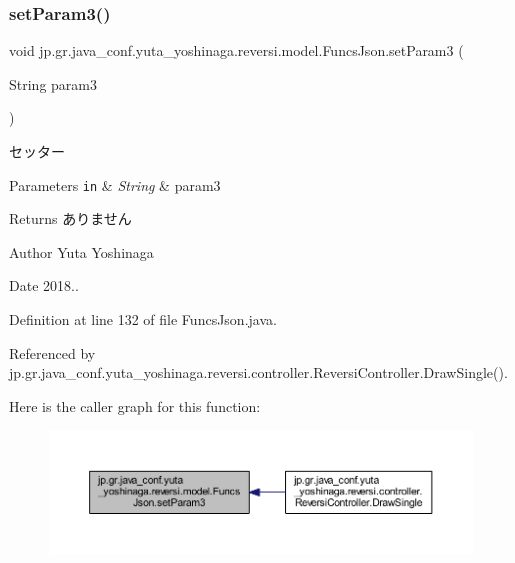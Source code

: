 \subsubsection{\texorpdfstring{set\+Param3()}{setParam3()}}
{\footnotesize\ttfamily void jp.\+gr.\+java\+\_\+conf.\+yuta\+\_\+yoshinaga.\+reversi.\+model.\+Funcs\+Json.\+set\+Param3 (\begin{DoxyParamCaption}\item[{String}]{param3 }\end{DoxyParamCaption})}



セッター 


\begin{DoxyParams}[1]{Parameters}
\mbox{\tt in}  & {\em String} & param3 \\
\hline
\end{DoxyParams}
\begin{DoxyReturn}{Returns}
ありません 
\end{DoxyReturn}
\begin{DoxyAuthor}{Author}
Yuta Yoshinaga 
\end{DoxyAuthor}
\begin{DoxyDate}{Date}
2018.. 
\end{DoxyDate}


Definition at line 132 of file Funcs\+Json.\+java.



Referenced by jp.\+gr.\+java\+\_\+conf.\+yuta\+\_\+yoshinaga.\+reversi.\+controller.\+Reversi\+Controller.\+Draw\+Single().

Here is the caller graph for this function\+:
\nopagebreak
\begin{figure}[H]
\begin{center}
\leavevmode
\includegraphics[width=350pt]{classjp_1_1gr_1_1java__conf_1_1yuta__yoshinaga_1_1reversi_1_1model_1_1_funcs_json_a27bc732004c573269cb63e71c1d1abcc_icgraph}
\end{center}
\end{figure}
\mbox{\label{classjp_1_1gr_1_1java__conf_1_1yuta__yoshinaga_1_1reversi_1_1model_1_1_funcs_json_a44af51970635551127a296e3c07db7ec}} 
